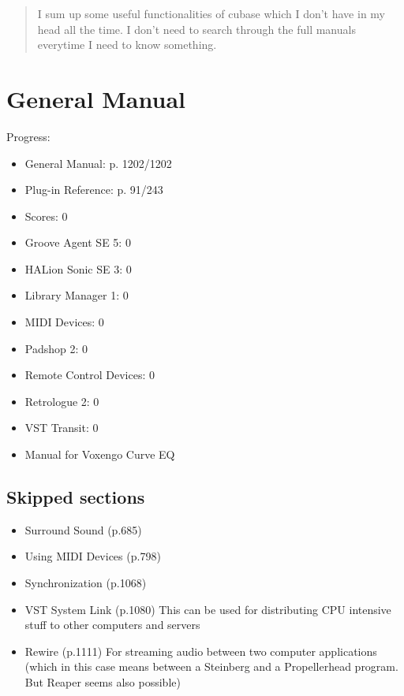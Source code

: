 \documentclass[10pt]{article}
\begin{document}
\maketitle
\newpage

\tableofcontents
\newpage

\begin{abstract}
I sum up some useful functionalities of cubase which I don't have in my head all the time. I don't need to search through the full manuals everytime I need to know something.
\end{abstract}

\section{General Manual}\label{GeneralManual}

Progress: 
\begin{itemize}
	\item General Manual: p. 1202/1202
	\item Plug-in Reference: p. 91/243
	\item Scores: 0
	\item Groove Agent SE 5: 0
	\item HALion Sonic SE 3: 0
	\item Library Manager 1: 0
	\item MIDI Devices: 0
	\item Padshop 2: 0
	\item Remote Control Devices: 0
	\item Retrologue 2: 0
	\item VST Transit: 0
	\item Manual for Voxengo Curve EQ
\end{itemize}


\subsection{Skipped sections}

\begin{itemize}
	\item Surround Sound (p.685)
	\item Using MIDI Devices (p.798)
	\item Synchronization (p.1068)
	\item VST System Link (p.1080) This can be used for distributing CPU intensive stuff to other computers and servers
	\item Rewire (p.1111) For streaming audio between two computer applications (which in this case means between a Steinberg and a Propellerhead program. But Reaper seems also possible)
\end{itemize}
\end{document}
